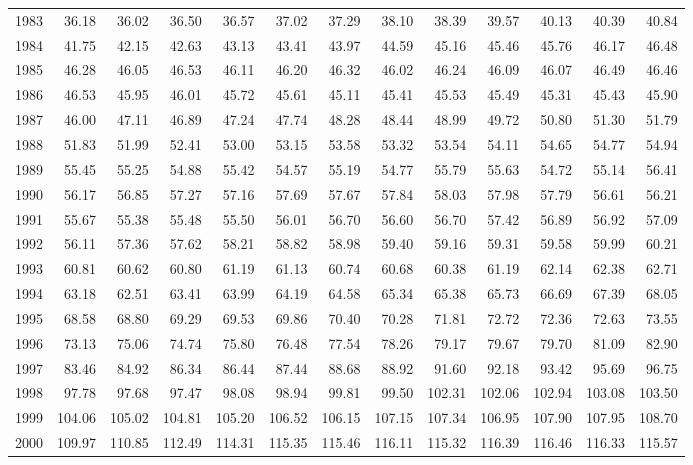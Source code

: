 \begin{longtable}{rrrrrrrrrrrrr}
  1983 & 36.18 & 36.02 & 36.50 & 36.57 & 37.02 & 37.29 & 38.10 & 38.39 & 39.57 & 40.13 & 40.39 & 40.84 \\ 
  1984 & 41.75 & 42.15 & 42.63 & 43.13 & 43.41 & 43.97 & 44.59 & 45.16 & 45.46 & 45.76 & 46.17 & 46.48 \\ 
  1985 & 46.28 & 46.05 & 46.53 & 46.11 & 46.20 & 46.32 & 46.02 & 46.24 & 46.09 & 46.07 & 46.49 & 46.46 \\ 
  1986 & 46.53 & 45.95 & 46.01 & 45.72 & 45.61 & 45.11 & 45.41 & 45.53 & 45.49 & 45.31 & 45.43 & 45.90 \\ 
  1987 & 46.00 & 47.11 & 46.89 & 47.24 & 47.74 & 48.28 & 48.44 & 48.99 & 49.72 & 50.80 & 51.30 & 51.79 \\ 
  1988 & 51.83 & 51.99 & 52.41 & 53.00 & 53.15 & 53.58 & 53.32 & 53.54 & 54.11 & 54.65 & 54.77 & 54.94 \\ 
  1989 & 55.45 & 55.25 & 54.88 & 55.42 & 54.57 & 55.19 & 54.77 & 55.79 & 55.63 & 54.72 & 55.14 & 56.41 \\ 
  1990 & 56.17 & 56.85 & 57.27 & 57.16 & 57.69 & 57.67 & 57.84 & 58.03 & 57.98 & 57.79 & 56.61 & 56.21 \\ 
  1991 & 55.67 & 55.38 & 55.48 & 55.50 & 56.01 & 56.70 & 56.60 & 56.70 & 57.42 & 56.89 & 56.92 & 57.09 \\ 
  1992 & 56.11 & 57.36 & 57.62 & 58.21 & 58.82 & 58.98 & 59.40 & 59.16 & 59.31 & 59.58 & 59.99 & 60.21 \\ 
  1993 & 60.81 & 60.62 & 60.80 & 61.19 & 61.13 & 60.74 & 60.68 & 60.38 & 61.19 & 62.14 & 62.38 & 62.71 \\ 
  1994 & 63.18 & 62.51 & 63.41 & 63.99 & 64.19 & 64.58 & 65.34 & 65.38 & 65.73 & 66.69 & 67.39 & 68.05 \\ 
  1995 & 68.58 & 68.80 & 69.29 & 69.53 & 69.86 & 70.40 & 70.28 & 71.81 & 72.72 & 72.36 & 72.63 & 73.55 \\ 
  1996 & 73.13 & 75.06 & 74.74 & 75.80 & 76.48 & 77.54 & 78.26 & 79.17 & 79.67 & 79.70 & 81.09 & 82.90 \\ 
  1997 & 83.46 & 84.92 & 86.34 & 86.44 & 87.44 & 88.68 & 88.92 & 91.60 & 92.18 & 93.42 & 95.69 & 96.75 \\ 
  1998 & 97.78 & 97.68 & 97.47 & 98.08 & 98.94 & 99.81 & 99.50 & 102.31 & 102.06 & 102.94 & 103.08 & 103.50 \\ 
  1999 & 104.06 & 105.02 & 104.81 & 105.20 & 106.52 & 106.15 & 107.15 & 107.34 & 106.95 & 107.90 & 107.95 & 108.70 \\ 
  2000 & 109.97 & 110.85 & 112.49 & 114.31 & 115.35 & 115.46 & 116.11 & 115.32 & 116.39 & 116.46 & 116.33 & 115.57 \\ 

\end{longtable}
